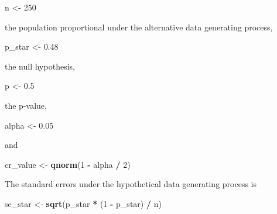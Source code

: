 \documentclass[]{book}
\newenvironment{Shaded}{\begin{snugshade}}{\end{snugshade}}
\newcommand{\KeywordTok}[1]{\textcolor[rgb]{0.13,0.29,0.53}{\textbf{#1}}}
\newcommand{\DecValTok}[1]{\textcolor[rgb]{0.00,0.00,0.81}{#1}}
\newcommand{\FloatTok}[1]{\textcolor[rgb]{0.00,0.00,0.81}{#1}}
\newcommand{\StringTok}[1]{\textcolor[rgb]{0.31,0.60,0.02}{#1}}
\newcommand{\OperatorTok}[1]{\textcolor[rgb]{0.81,0.36,0.00}{\textbf{#1}}}
\newcommand{\NormalTok}[1]{#1}
\theoremstyle{definition}
\theoremstyle{definition}
\theoremstyle{definition}
\theoremstyle{remark}
\begin{document}
\begin{Shaded}
\begin{Highlighting}[]
\NormalTok{n <-}\StringTok{ }\DecValTok{250}
\end{Highlighting}
\end{Shaded}

the population proportional under the alternative data generating
process,

\begin{Shaded}
\begin{Highlighting}[]
\NormalTok{p_star <-}\StringTok{ }\FloatTok{0.48}
\end{Highlighting}
\end{Shaded}

the null hypothesis,

\begin{Shaded}
\begin{Highlighting}[]
\NormalTok{p <-}\StringTok{ }\FloatTok{0.5}
\end{Highlighting}
\end{Shaded}

the p-value,

\begin{Shaded}
\begin{Highlighting}[]
\NormalTok{alpha <-}\StringTok{ }\FloatTok{0.05}
\end{Highlighting}
\end{Shaded}

and

\begin{Shaded}
\begin{Highlighting}[]
\NormalTok{cr_value <-}\StringTok{ }\KeywordTok{qnorm}\NormalTok{(}\DecValTok{1} \OperatorTok{-}\StringTok{ }\NormalTok{alpha }\OperatorTok{/}\StringTok{ }\DecValTok{2}\NormalTok{)}
\end{Highlighting}
\end{Shaded}

The standard errors under the hypothetical data generating process is

\begin{Shaded}
\begin{Highlighting}[]
\NormalTok{se_star <-}\StringTok{ }\KeywordTok{sqrt}\NormalTok{(p_star }\OperatorTok{*}\StringTok{ }\NormalTok{(}\DecValTok{1} \OperatorTok{-}\StringTok{ }\NormalTok{p_star) }\OperatorTok{/}\StringTok{ }\NormalTok{n)}
\end{Highlighting}
\end{Shaded}
\end{document}
